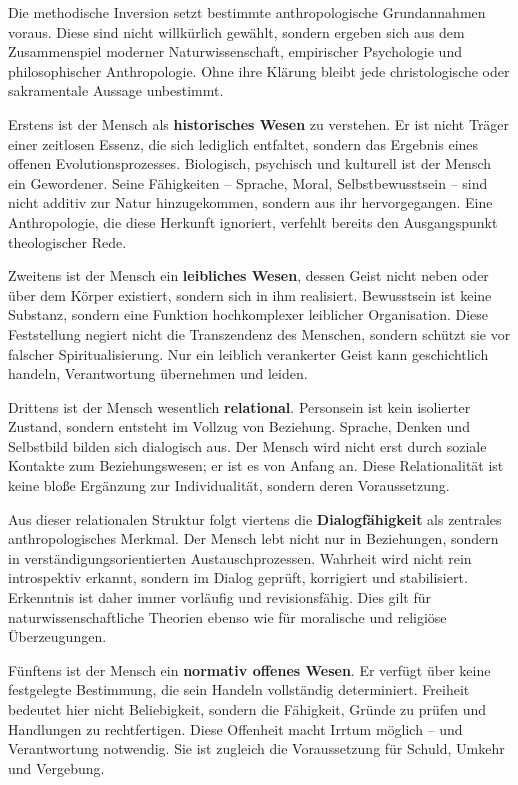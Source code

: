 \documentclass[
]{article}
\begin{document}
Die methodische Inversion setzt bestimmte anthropologische Grundannahmen voraus. Diese sind nicht willkürlich gewählt, sondern ergeben sich aus dem Zusammenspiel moderner Naturwissenschaft, empirischer Psychologie und philosophischer Anthropologie. Ohne ihre Klärung bleibt jede christologische oder sakramentale Aussage unbestimmt.

Erstens ist der Mensch als \textbf{historisches Wesen} zu verstehen. Er ist nicht Träger einer zeitlosen Essenz, die sich lediglich entfaltet, sondern das Ergebnis eines offenen Evolutionsprozesses. Biologisch, psychisch und kulturell ist der Mensch ein Gewordener. Seine Fähigkeiten -- Sprache, Moral, Selbstbewusstsein -- sind nicht additiv zur Natur hinzugekommen, sondern aus ihr hervorgegangen. Eine Anthropologie, die diese Herkunft ignoriert, verfehlt bereits den Ausgangspunkt theologischer Rede.

Zweitens ist der Mensch ein \textbf{leibliches Wesen}, dessen Geist nicht neben oder über dem Körper existiert, sondern sich in ihm realisiert. Bewusstsein ist keine Substanz, sondern eine Funktion hochkomplexer leiblicher Organisation. Diese Feststellung negiert nicht die Transzendenz des Menschen, sondern schützt sie vor falscher Spiritualisierung. Nur ein leiblich verankerter Geist kann geschichtlich handeln, Verantwortung übernehmen und leiden.

Drittens ist der Mensch wesentlich \textbf{relational}. Personsein ist kein isolierter Zustand, sondern entsteht im Vollzug von Beziehung. Sprache, Denken und Selbstbild bilden sich dialogisch aus. Der Mensch wird nicht erst durch soziale Kontakte zum Beziehungswesen; er ist es von Anfang an. Diese Relationalität ist keine bloße Ergänzung zur Individualität, sondern deren Voraussetzung.

Aus dieser relationalen Struktur folgt viertens die \textbf{Dialogfähigkeit} als zentrales anthropologisches Merkmal. Der Mensch lebt nicht nur in Beziehungen, sondern in verständigungsorientierten Austauschprozessen. Wahrheit wird nicht rein introspektiv erkannt, sondern im Dialog geprüft, korrigiert und stabilisiert. Erkenntnis ist daher immer vorläufig und revisionsfähig. Dies gilt für naturwissenschaftliche Theorien ebenso wie für moralische und religiöse Überzeugungen.

Fünftens ist der Mensch ein \textbf{normativ offenes Wesen}. Er verfügt über keine festgelegte Bestimmung, die sein Handeln vollständig determiniert. Freiheit bedeutet hier nicht Beliebigkeit, sondern die Fähigkeit, Gründe zu prüfen und Handlungen zu rechtfertigen. Diese Offenheit macht Irrtum möglich -- und Verantwortung notwendig. Sie ist zugleich die Voraussetzung für Schuld, Umkehr und Vergebung.
\end{document}
